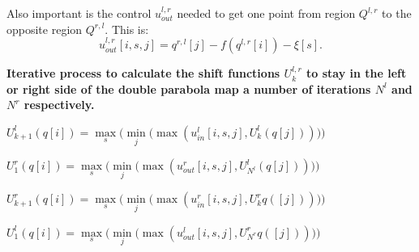 Also important is the control $u_{out}^{l,r}$ needed to get one point from region $Q^{l,r}$ to the opposite region $Q^{r,l}$. This is:
\begin{equation*}
u_{out}^{l,r}[i,s,j] = q^{r,l}[j] - f(q^{l,r}[i]) - \xi[s].
\end{equation*}



\begin{algorithm}[h!]
    \caption{\textbf{Iterative process to calculate the shift functions $U^{l,r}_{k}$ to stay in the left or right side of the double parabola map a number of iterations $N^l$ and $N^r$ respectively.} }
    \label{alg:ShiftFunction}
\renewcommand{\thealgorithm}{}

\begin{algorithmic}[0]
    

          \State  $U^{l}_{k+1}(q[i])=\max\limits_s\Big(\min\limits_j\big(\max(u_{in}^l[i,s,j],U^l_k(q[j]))\big)\Big)$

        \EndFor
    
       \State   $U^{r}_{1}(q[i])=\max\limits_s\Big(\min\limits_j\big(\max(u_{out}^r[i,s,j],U^l_{N^l}(q[j]))\big)\Big)$   
        
        
            \State  $U^{r}_{k+1}(q[i])=\max\limits_s\Big(\min\limits_j\big(\max(u_{in}^r[i,s,j],U^r_kq([j]))\big)\Big)$
            
        \EndFor
        
        \State  $U^{l}_{1}(q[i])=\max\limits_s\Big(\min\limits_j\big(\max(u_{out}^l[i,s,j],U^r_{N^r}q([j]))\big)\Big)$
    \EndWhile
    \end{algorithmic}
\end{algorithm}



